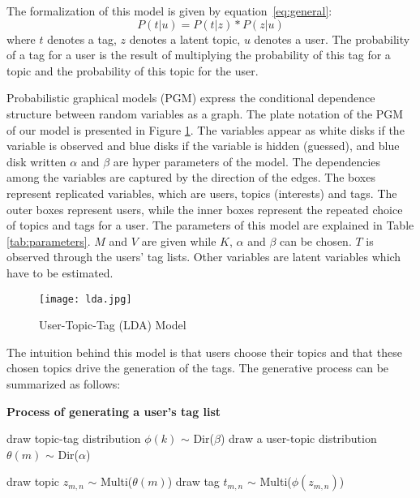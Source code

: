 The formalization of this model is given by equation~\ref{eq:general}: 
\begin{equation}
P(t|u)=P(t|z)*P(z|u)
\label{eq:general}
\end{equation}
where $t$ denotes a tag, $z$ denotes a latent topic, $u$ denotes a user. The probability of a tag for a user is the result of multiplying the probability of this tag for a topic and the probability of this topic for the user.

Probabilistic graphical models (PGM) express the conditional dependence structure between random variables as a graph. 
The plate notation of the PGM of our model is presented in Figure \ref{fig:lda}. 
The variables appear as white disks if the variable is observed and blue disks if the variable is hidden (guessed), and blue disk written $\alpha$ and $\beta$ are hyper parameters of the model.
The dependencies among the variables are captured by the direction of the edges. 
The boxes represent replicated variables, which are users, topics (interests) and tags. The outer boxes represent users, while the inner boxes represent the repeated choice of topics and tags for a user. The parameters of this model are explained in Table \ref{tab:parameters}.
$M$ and $V$ are given while $K$, $\alpha$ and $\beta$ can be chosen. $T$ is observed through the users' tag lists. Other variables are latent variables which have to be estimated.

\begin{figure}[htbp]\centering
\texttt{[image: lda.jpg]}  %
\caption{User-Topic-Tag (LDA) Model}
\label{fig:lda}
\end{figure}

The intuition behind this model is that users choose their topics and that these chosen topics drive the generation of the tags.
The generative process can be summarized as follows:

\begin{algorithm}%
\begin{algorithmic}[1]
\label{algo:algoldagenerateprocess}
\State \textbf{Process of generating a user’s tag list} 

\State draw topic-tag distribution $\phi(k)$ $\sim$ Dir($\beta$)
\EndFor
{}
\State draw a user-topic distribution $\theta(m)$ $\sim$ Dir($\alpha$)
\EndFor
{}

\State draw topic $z_{m,n}$  $\sim$ Multi($\theta(m)$)
\State draw tag $t_{m,n}$ $\sim$ Multi($\phi(z_{m,n})$)

\EndFor
\end{algorithmic}
\end{algorithm}



